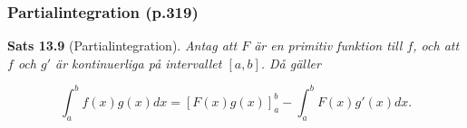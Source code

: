 \documentclass[11pt]{article}
\begin{document}
\subsubsection{Partialintegration (p.319)}

\textbf{Sats 13.9} (Partialintegration). \textit{Antag att $F$ är en primitiv funktion till $f$, och att $f$ och $g'$ är kontinuerliga på intervallet $[a, b]$. Då gäller}

\begin{equation}
    \int_a^b{f(x)g(x)}dx = \left [F(x)g(x)\right ]_a^b - \int_a^b{F(x)g'(x)}dx.
\end{equation}
\end{document}
